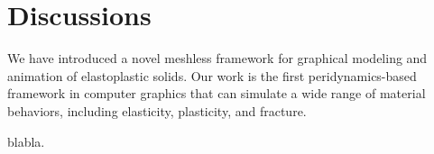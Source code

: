 \section{Discussions}

We have introduced a novel meshless framework for graphical modeling and animation of elastoplastic solids. Our work is the first peridynamics-based framework in computer graphics that can simulate a wide range of material behaviors, including elasticity, plasticity, and fracture.

blabla.


%





